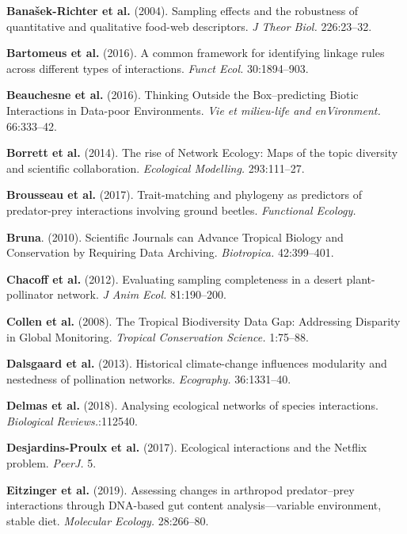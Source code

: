 \leavevmode\hypertarget{ref-BanaCatt04}{}%
\textbf{Banašek-Richter et al.} (2004). Sampling effects and the
robustness of quantitative and qualitative food-web descriptors. \emph{J
Theor Biol.} 226:23--32.

\leavevmode\hypertarget{ref-BartGrav16}{}%
\textbf{Bartomeus et al.} (2016). A common framework for identifying
linkage rules across different types of interactions. \emph{Funct Ecol.}
30:1894--903.

\leavevmode\hypertarget{ref-BeauDesj16}{}%
\textbf{Beauchesne et al.} (2016). Thinking Outside the Box--predicting
Biotic Interactions in Data-poor Environments. \emph{Vie et milieu-life
and enVironment.} 66:333--42.

\leavevmode\hypertarget{ref-BorrMood14}{}%
\textbf{Borrett et al.} (2014). The rise of Network Ecology: Maps of the
topic diversity and scientific collaboration. \emph{Ecological
Modelling.} 293:111--27.

\leavevmode\hypertarget{ref-BrouGrav17}{}%
\textbf{Brousseau et al.} (2017). Trait-matching and phylogeny as
predictors of predator-prey interactions involving ground beetles.
\emph{Functional Ecology.}

\leavevmode\hypertarget{ref-Brun10}{}%
\textbf{Bruna}. (2010). Scientific Journals can Advance Tropical Biology
and Conservation by Requiring Data Archiving. \emph{Biotropica.}
42:399--401.

\leavevmode\hypertarget{ref-ChacVazq12}{}%
\textbf{Chacoff et al.} (2012). Evaluating sampling completeness in a
desert plant-pollinator network. \emph{J Anim Ecol.} 81:190--200.

\leavevmode\hypertarget{ref-CollRam08}{}%
\textbf{Collen et al.} (2008). The Tropical Biodiversity Data Gap:
Addressing Disparity in Global Monitoring. \emph{Tropical Conservation
Science.} 1:75--88.

\leavevmode\hypertarget{ref-DalsTroj13}{}%
\textbf{Dalsgaard et al.} (2013). Historical climate-change influences
modularity and nestedness of pollination networks. \emph{Ecography.}
36:1331--40.

\leavevmode\hypertarget{ref-DelmBess18}{}%
\textbf{Delmas et al.} (2018). Analysing ecological networks of species
interactions. \emph{Biological Reviews.}:112540.

\leavevmode\hypertarget{ref-DesjLaig17}{}%
\textbf{Desjardins-Proulx et al.} (2017). Ecological interactions and
the Netflix problem. \emph{PeerJ.} 5.

\leavevmode\hypertarget{ref-EitzAbre19}{}%
\textbf{Eitzinger et al.} (2019). Assessing changes in arthropod
predator--prey interactions through DNA-based gut content
analysis---variable environment, stable diet. \emph{Molecular Ecology.}
28:266--80.

